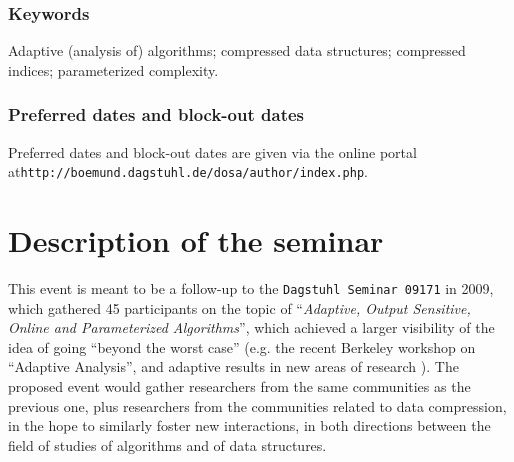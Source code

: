 \documentclass[a4paper,10pt]{article}
\begin{document}


\subsubsection*{Keywords}


Adaptive (analysis of) algorithms;
compressed data structures;
compressed indices;
parameterized complexity.


\subsubsection*{Preferred dates and block-out dates}

Preferred dates and block-out dates are given via the online portal at\newline \texttt{http://boemund.dagstuhl.de/dosa/author/index.php}.


\section{Description of the seminar}

\begin{INUTILE}
This event is meant to be a follow-up to the \texttt{Dagstuhl Seminar 09171} in 2009, which gathered 45 participants on the topic of ``\emph{Adaptive, Output Sensitive, Online and Parameterized Algorithms}'', which achieved a larger visibility of the idea of going ``beyond the worst case'' (e.g. the recent Berkeley workshop on ``Adaptive Analysis'', and adaptive results in new areas of research \cite{2015-SPIRE-AdaptiveComputationOfTheSwapInsertCorrectionDistance-BarbayPerez}). The proposed event would gather researchers from the same communities as the previous one, plus researchers from the communities related to data compression, in the hope to similarly foster new interactions, in both directions between the field of studies of algorithms and of data structures.
\end{INUTILE}
\end{document}
